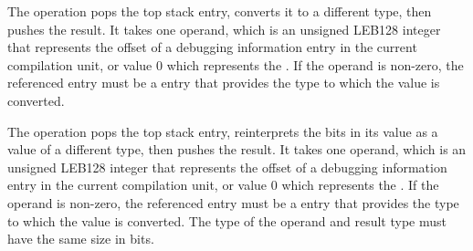 \begin{enumerate}[1. ]
\itembfnl{\DWOPconvertTARG}
The \DWOPconvertNAME{} operation pops the top stack entry, converts it to a
different type, then pushes the result. It takes one operand, which is an
unsigned LEB128 integer that represents the offset of a debugging
information entry in the current compilation unit, or value 0 which
represents the \generictype. If the operand is non-zero, the
referenced entry must be a \DWTAGbasetype{} entry that provides the type
to which the value is converted.

\itembfnl{\DWOPreinterpretTARG}
The \DWOPreinterpretNAME{} operation pops the top stack entry, reinterprets
the bits in its value as a value of a different type, then pushes the
result. It takes one operand, which is an unsigned LEB128 integer that
represents the offset of a debugging information entry in the current
compilation unit, or value 0 which represents the \generictype.
If the operand is non-zero, the referenced entry must be a
\DWTAGbasetype{} entry that provides the type to which the value is converted.
The type of the operand and result type must have the same size in bits.

\end{enumerate}

